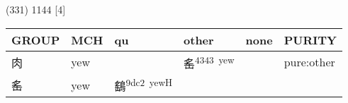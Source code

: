 \documentclass[14pt,a4paper]{scrartcl}
\begin{document}
(331) 1144 {[}4{]}

\begin{longtable}[c]{@{}llllll@{}}
\toprule
\begin{minipage}[b]{0.14\columnwidth}\raggedright\strut
GROUP
\strut\end{minipage} &
\begin{minipage}[b]{0.14\columnwidth}\raggedright\strut
MCH
\strut\end{minipage} &
\begin{minipage}[b]{0.14\columnwidth}\raggedright\strut
qu
\strut\end{minipage} &
\begin{minipage}[b]{0.14\columnwidth}\raggedright\strut
other
\strut\end{minipage} &
\begin{minipage}[b]{0.14\columnwidth}\raggedright\strut
none
\strut\end{minipage} &
\begin{minipage}[b]{0.14\columnwidth}\raggedright\strut
PURITY
\strut\end{minipage}\tabularnewline
\midrule
\endhead
\begin{minipage}[t]{0.14\columnwidth}\raggedright\strut
肉
\strut\end{minipage} &
\begin{minipage}[t]{0.14\columnwidth}\raggedright\strut
yew
\strut\end{minipage} &
\begin{minipage}[t]{0.14\columnwidth}\raggedright\strut
\strut\end{minipage} &
\begin{minipage}[t]{0.14\columnwidth}\raggedright\strut
䍃\textsuperscript{4343~yew}
\strut\end{minipage} &
\begin{minipage}[t]{0.14\columnwidth}\raggedright\strut
\strut\end{minipage} &
\begin{minipage}[t]{0.14\columnwidth}\raggedright\strut
pure:other
\strut\end{minipage}\tabularnewline
\begin{minipage}[t]{0.14\columnwidth}\raggedright\strut
䍃
\strut\end{minipage} &
\begin{minipage}[t]{0.14\columnwidth}\raggedright\strut
yew
\strut\end{minipage} &
\begin{minipage}[t]{0.14\columnwidth}\raggedright\strut
鷂\textsuperscript{9dc2~yewH}

\end{minipage}
\end{longtable}
\end{document}
